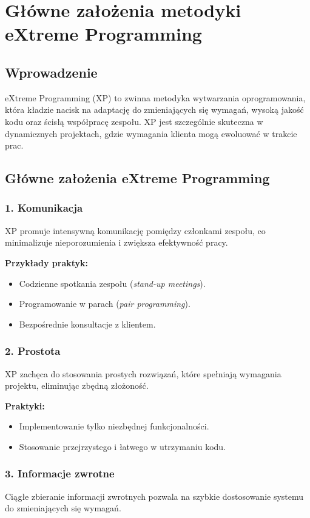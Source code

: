 \section{Główne założenia metodyki eXtreme Programming}

\subsection{Wprowadzenie}
eXtreme Programming (XP) to zwinna metodyka wytwarzania oprogramowania, która kładzie nacisk na adaptację do zmieniających się wymagań, wysoką jakość kodu oraz ścisłą współpracę zespołu. XP jest szczególnie skuteczna w dynamicznych projektach, gdzie wymagania klienta mogą ewoluować w trakcie prac.

\subsection{Główne założenia eXtreme Programming}

\subsubsection{1. Komunikacja}
XP promuje intensywną komunikację pomiędzy członkami zespołu, co minimalizuje nieporozumienia i zwiększa efektywność pracy.

\textbf{Przykłady praktyk:}
\begin{itemize}
    \item Codzienne spotkania zespołu (\textit{stand-up meetings}).
    \item Programowanie w parach (\textit{pair programming}).
    \item Bezpośrednie konsultacje z klientem.
\end{itemize}

\subsubsection{2. Prostota}
XP zachęca do stosowania prostych rozwiązań, które spełniają wymagania projektu, eliminując zbędną złożoność.

\textbf{Praktyki:}
\begin{itemize}
    \item Implementowanie tylko niezbędnej funkcjonalności.
    \item Stosowanie przejrzystego i łatwego w utrzymaniu kodu.
\end{itemize}

\subsubsection{3. Informacje zwrotne}
Ciągłe zbieranie informacji zwrotnych pozwala na szybkie dostosowanie systemu do zmieniających się wymagań.

